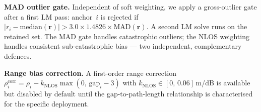 \textbf{MAD outlier gate.}
Independent of soft weighting, we apply a gross-outlier gate after a first
LM pass: anchor~$i$ is rejected if
$|r_i - \mathrm{median}(\mathbf{r})| > 3.0 \times 1.4826 \times \mathrm{MAD}(\mathbf{r})$.
A second LM solve runs on the retained set.
The MAD gate handles catastrophic outliers; the NLOS weighting handles
consistent sub-catastrophic bias --- two independent, complementary defences.

\textbf{Range bias correction.}
A first-order range correction
$\rho_i^\text{corr} = \rho_i - k_\text{NLOS}\max(0,\,\text{gap}_i - 3)$
with $k_\text{NLOS} \in [0,\,0.06]$\,m/dB is available but disabled by
default until the gap-to-path-length relationship is characterised for
the specific deployment.
